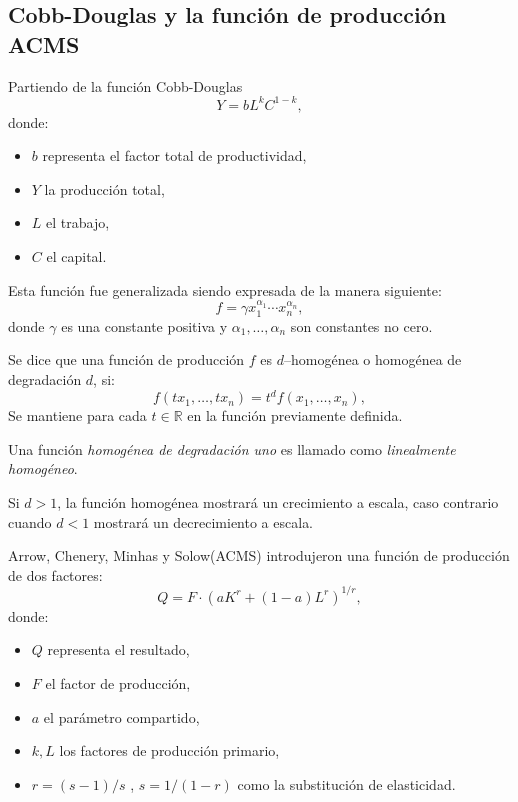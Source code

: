 \subsection{Cobb-Douglas y la función de producción ACMS}

Partiendo de la función Cobb-Douglas
\begin{equation}%
Y = bL^{k}C^{1-k},
\end{equation}
donde:
\begin{itemize}
	\item $b$ representa el factor total de productividad,
	\item $Y$ la producción total,
	\item $L$ el trabajo,
	\item $C$ el capital.
\end{itemize}
Esta función fue generalizada siendo expresada de la manera siguiente:
\begin{equation}%
f = \gamma{x}_{1}^{\alpha_{1}}\cdots x_{n}^{\alpha_{n}},
\end{equation}
donde $\gamma$ es una constante positiva y $\alpha_{1},\ldots,\alpha_{n}$ son constantes no cero.

Se dice que una función de producción $f$ es $d$--homogénea o homogénea de degradación $d$, si:
\begin{equation}%
f\left(tx_{1},\ldots,tx_{n}\right) = t^{d}f\left(x_{1},\ldots,x_{n}\right),
\end{equation}
Se mantiene para cada $t\in\mathbb{R}$ en la función previamente definida.

Una función \emph{homogénea de degradación uno} es llamado como \emph{linealmente homogéneo}.

Si $d>1$, la función homogénea mostrará un crecimiento a escala, caso contrario cuando $d<1$ mostrará un decrecimiento a escala.

Arrow, Chenery, Minhas y Solow(ACMS) introdujeron una función de producción de dos factores:
\begin{equation}%
Q=F\cdot(aK^r + (1-a)L^r)^{1/r},
\end{equation}
donde:
\begin{itemize}
	\item $Q$ representa el resultado,
	\item $F$ el factor de producción,
	\item $a$ el parámetro compartido,
	\item $k,L$ los factores de producción primario,
	\item $r=\left(s-1\right)/s$ , $s=1/\left(1-r\right)$ como la substitución de elasticidad.
\end{itemize}


